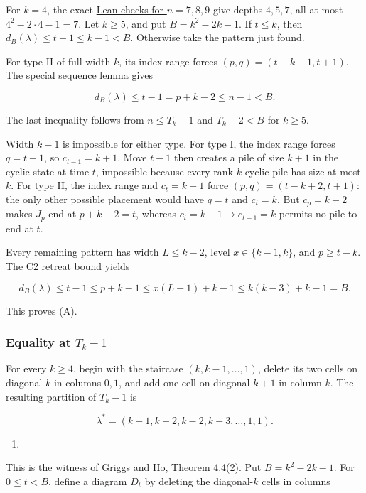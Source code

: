 \documentclass[11pt,a4paper]{article}
\providecommand{\tightlist}{\setlength{\itemsep}{0pt}\setlength{\parskip}{0pt}}
\begin{document}
For \(k=4\), the exact \href{https://github.com/mpelteshki/climbing-to-the-frontier/blob/212bba53b1818c08c40b8c4b48f636651eaf6410/cagent/p3/c3/README.md}{Lean checks for \(n=7,8,9\)} give depths \(4,5,7\), all at most \(4^2-2\cdot4-1=7\). Let \(k\ge5\), and put \(B=k^2-2k-1\). If \(t\le k\), then \(d_B(\lambda)\le t-1\le k-1<B\). Otherwise take the pattern just found.

For type II of full width \(k\), its index range forces \((p,q)=(t-k+1,t+1)\). The special sequence lemma gives

\[
d_B(\lambda)\le t-1=p+k-2\le n-1<B.
\]

The last inequality follows from \(n\le T_k-1\) and \(T_k-2<B\) for \(k\ge5\).

Width \(k-1\) is impossible for either type. For type I, the index range forces \(q=t-1\), so \(c_{t-1}=k+1\). Move \(t-1\) then creates a pile of size \(k+1\) in the cyclic state at time \(t\), impossible because every rank-\(k\) cyclic pile has size at most \(k\). For type II, the index range and \(c_t=k-1\) force \((p,q)=(t-k+2,t+1)\): the only other possible placement would have \(q=t\) and \(c_t=k\). But \(c_p=k-2\) makes \(J_p\) end at \(p+k-2=t\), whereas \(c_t=k-1\to c_{t+1}=k\) permits no pile to end at \(t\).

Every remaining pattern has width \(L\le k-2\), level \(x\in\{k-1,k\}\), and \(p\ge t-k\). The C2 retreat bound yields

\[
d_B(\lambda)\le t-1\le p+k-1
\le x(L-1)+k-1
\le k(k-3)+k-1=B.
\]

This proves (A).

\subsubsection{\texorpdfstring{Equality at \(T_k-1\)}{Equality at T\_k-1}}\label{equality-at-t_k-1}

For every \(k\ge4\), begin with the staircase \((k,k-1,\ldots,1)\), delete its two cells on diagonal \(k\) in columns \(0,1\), and add one cell on diagonal \(k+1\) in column \(k\). The resulting partition of \(T_k-1\) is

\[
\lambda^*=(k-1,k-2,k-2,k-3,\ldots,1,1).
\]

\begin{enumerate}
\def\labelenumi{(\Alph{enumi})}
\setcounter{enumi}{5}
\tightlist
\item
\end{enumerate}

This is the witness of \href{https://sc.edu/study/colleges_schools/artsandsciences/mathematics/research/imi/research/documents/1998/1998_12.pdf}{Griggs and Ho, Theorem 4.4(2)}. Put \(B=k^2-2k-1\). For \(0\le t<B\), define a diagram \(D_t\) by deleting the diagonal-\(k\) cells in columns
\end{document}
